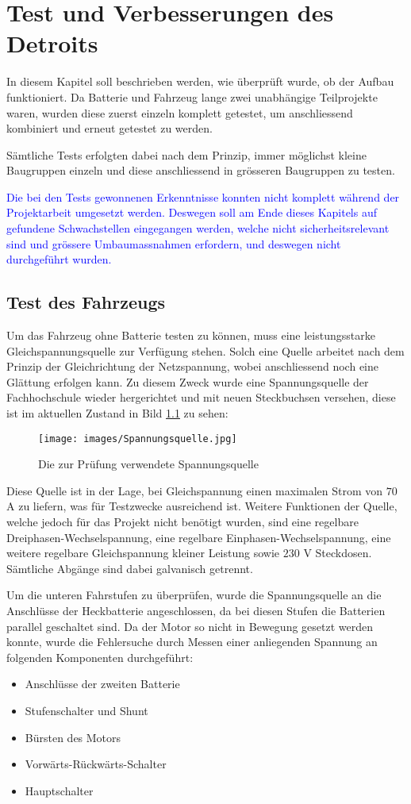 \chapter{Test und Verbesserungen des Detroits}
In diesem Kapitel soll beschrieben werden, wie überprüft wurde, ob der Aufbau funktioniert. Da Batterie und Fahrzeug lange zwei unabhängige Teilprojekte waren, wurden diese zuerst einzeln komplett getestet, um anschliessend kombiniert und erneut getestet zu werden.

Sämtliche Tests erfolgten dabei nach dem Prinzip, immer möglichst kleine Baugruppen einzeln und diese anschliessend in grösseren Baugruppen zu testen.

\textcolor{blue}{Die bei den Tests gewonnenen Erkenntnisse konnten nicht komplett während der Projektarbeit umgesetzt werden. Deswegen soll am Ende dieses Kapitels auf gefundene Schwachstellen eingegangen werden, welche nicht sicherheitsrelevant sind und grössere Umbaumassnahmen erfordern, und deswegen nicht durchgeführt wurden.}

\section{Test des Fahrzeugs}
Um das Fahrzeug ohne Batterie testen zu können, muss eine leistungsstarke Gleichspannungsquelle zur Verfügung stehen. Solch eine Quelle arbeitet nach dem Prinzip der Gleichrichtung der Netzspannung, wobei anschliessend noch eine Glättung erfolgen kann. Zu diesem Zweck wurde eine Spannungsquelle der Fachhochschule wieder hergerichtet und mit neuen Steckbuchsen versehen, diese ist im aktuellen Zustand in Bild \ref{fig:Spannungsquelle_blau} zu sehen:

\begin{figure}[h]
	\centering
		\texttt{[image: images/Spannungsquelle.jpg]}
	\caption{Die zur Prüfung verwendete Spannungsquelle}
	\label{fig:Spannungsquelle_blau}
\end{figure}

Diese Quelle ist in der Lage, bei Gleichspannung einen maximalen Strom von $70$ A zu liefern, was für Testzwecke ausreichend ist. Weitere Funktionen der Quelle, welche jedoch für das Projekt nicht benötigt wurden, sind eine regelbare Dreiphasen-Wechselspannung, eine regelbare Einphasen-Wechselspannung, eine weitere regelbare Gleichspannung kleiner Leistung sowie $230$ V Steckdosen. Sämtliche Abgänge sind dabei galvanisch getrennt.

Um die unteren Fahrstufen zu überprüfen, wurde die Spannungsquelle an die Anschlüsse der Heckbatterie angeschlossen, da bei diesen Stufen die Batterien parallel geschaltet sind. Da der Motor so nicht in Bewegung gesetzt werden konnte, wurde die Fehlersuche durch Messen einer anliegenden Spannung an folgenden Komponenten durchgeführt: \begin{itemize}
	\item Anschlüsse der zweiten Batterie
	\item Stufenschalter und Shunt
	\item Bürsten des Motors
	\item Vorwärts-Rückwärts-Schalter
	\item Hauptschalter
\end{itemize}

